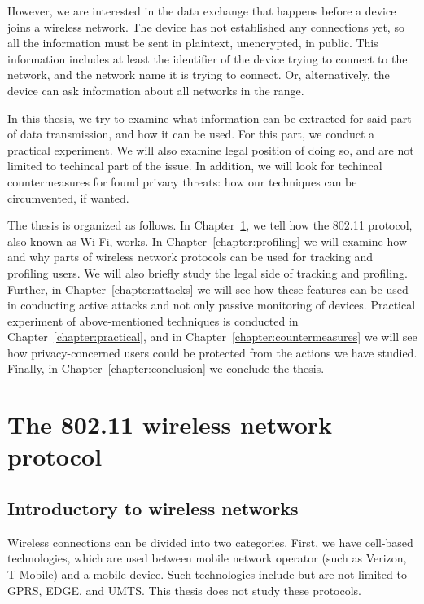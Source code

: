 \documentclass[12pt,a4paper,oneside,pdftex]{report}
\begin{document}
However, we are interested in the data exchange that happens before a device joins a wireless network. The device has not established any connections yet, so all the information must be sent in plaintext, unencrypted, in public. This information includes at least the identifier of the device trying to connect to the network, and the network name it is trying to connect. Or, alternatively, the device can ask information about all networks in the range.


In this thesis, we try to examine what information can be extracted for said part of data transmission, and how it can be used. For this part, we conduct a practical experiment. We will also examine legal position of doing so, and are not limited to techincal part of the issue. In addition, we will look for techincal countermeasures for found privacy threats: how our techniques can be circumvented, if wanted.

The thesis is organized as follows. In Chapter~\ref{chapter:protocol}, we tell how the 802.11 protocol, also known as Wi-Fi, works. In Chapter~\ref{chapter:profiling} we will examine how and why parts of wireless network protocols can be used for tracking and profiling users. We will also briefly study the legal side of tracking and profiling. Further, in Chapter~\ref{chapter:attacks} we will see how these features can be used in conducting active attacks and not only passive monitoring of devices. Practical experiment of above-mentioned techniques is conducted in Chapter~\ref{chapter:practical}, and in Chapter~\ref{chapter:countermeasures} we will see how privacy-concerned users could be protected from the actions we have studied. Finally, in Chapter~\ref{chapter:conclusion} we conclude the thesis.




\chapter{The 802.11 wireless network protocol}
\label{chapter:protocol}


\section{Introductory to wireless networks}
\label{sec:intro_wireless}

Wireless connections can be divided into two categories. First, we have cell-based technologies, which are used between mobile network operator (such as Verizon, T-Mobile) and a mobile device. Such technologies include but are not limited to GPRS, EDGE, and UMTS. This thesis does not study these protocols.
\end{document}
